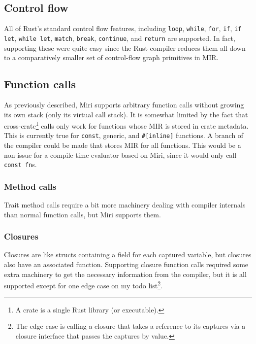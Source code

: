 \documentclass[twocolumn]{article}
\newcommand{\rust}[1]{\texttt{#1}}
\begin{document}
\subsection{Control flow}

All of Rust's standard control flow features, including \rust{loop}, \rust{while}, \rust{for},
\rust{if}, \rust{if let}, \rust{while let}, \rust{match}, \rust{break}, \rust{continue}, and
\rust{return} are supported. In fact, supporting these were quite easy since the Rust compiler
reduces them all down to a comparatively smaller set of control-flow graph primitives in MIR.

\subsection{Function calls}

As previously described, Miri supports arbitrary function calls without growing its own stack (only
its virtual call stack). It is somewhat limited by the fact that cross-crate\footnote{A crate is a
single Rust library (or executable).} calls only work for functions whose MIR is stored in crate
metadata. This is currently true for \rust{const}, generic, and \texttt{\#[inline]} functions. A
branch of the compiler could be made that stores MIR for all functions. This would be a non-issue
for a compile-time evaluator based on Miri, since it would only call \rust{const fn}s.

\subsubsection{Method calls}

Trait method calls require a bit more machinery dealing with compiler internals than normal function
calls, but Miri supports them.

\subsubsection{Closures}

Closures are like structs containing a field for each captured variable, but closures also have an
associated function. Supporting closure function calls required some extra machinery to get the
necessary information from the compiler, but it is all supported except for one edge case on my todo
list\footnote{The edge case is calling a closure that takes a reference to its captures via a
closure interface that passes the captures by value.}.
\end{document}
